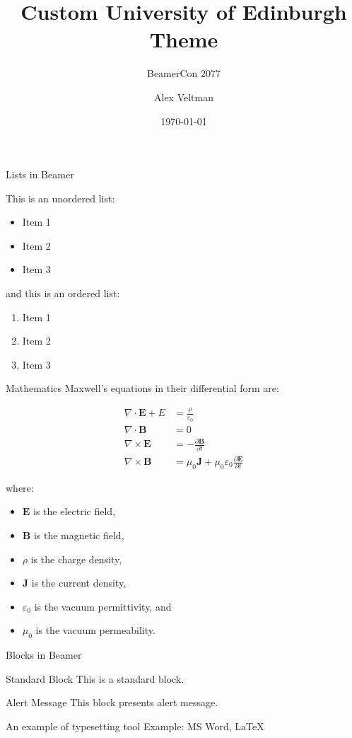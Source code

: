 \documentclass{beamer}
\title{Custom University of Edinburgh Theme}
\subtitle{BeamerCon 2077}
\author{Alex Veltman}
\date{\today}
\institute[UoE]{University of Edinburgh}
\begin{document}
\begin{frame}[plain]
    \titlepage 
\end{frame}

\logo{}

\begin{frame}{Lists in Beamer}

This is an unordered list:
\begin{itemize}
    \item Item 1
    \item Item 2
    \item Item 3
\end{itemize}

and this is an ordered list:
\begin{enumerate}
    \item Item 1
    \item Item 2
    \item Item 3
\end{enumerate}

\end{frame}

\begin{frame}{Mathematics}
    Maxwell's equations in their differential form are:

    \begin{align}
        \nabla \cdot \mathbf{E} + E&= \frac{\rho}{\varepsilon_0} \\
        \nabla \cdot \mathbf{B} &= 0 \\
        \nabla \times \mathbf{E} &= -\frac{\partial \mathbf{B}}{\partial t} \\
        \nabla \times \mathbf{B} &= \mu_0 \mathbf{J} + \mu_0 \varepsilon_0 \frac{\partial \mathbf{E}}{\partial t}
    \end{align}
    
    where:
    \begin{itemize}
        \item $\mathbf{E}$ is the electric field,
        \item $\mathbf{B}$ is the magnetic field,
        \item $\rho$ is the charge density,
        \item $\mathbf{J}$ is the current density,
        \item $\varepsilon_0$ is the vacuum permittivity, and
        \item $\mu_0$ is the vacuum permeability.
    \end{itemize}
\end{frame}

\begin{frame}{Blocks in Beamer}
    \begin{block}{Standard Block}
        This is a standard block.
    \end{block}
    \begin{alertblock}{Alert Message}
        This block presents alert message.
    \end{alertblock}
    \begin{exampleblock}{An example of typesetting tool}
        Example: MS Word, \LaTeX{}
    \end{exampleblock}
\end{frame} 
\end{document}
